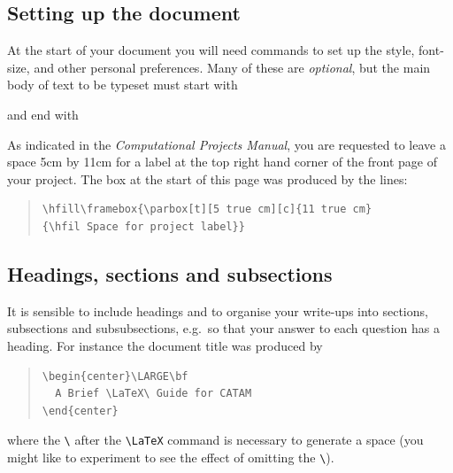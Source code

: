 \subsection{Setting up the document}\label{setup}

At the start of your document you will need commands to set up the
style, font-size, and other personal preferences.  Many of these are
\textit{optional}, but the main body of text to be typeset must start
with
\begin{quote}
\verb||
\end{quote}
and end with
\begin{quote}
\verb||
\end{quote}


As indicated in the \textsl{Computational Projects Manual}, you are
requested to leave a space 5cm by 11cm for a label at the top right
hand corner of the front page of your project. The box at the start of
this page was produced by the lines:
\begin{quote}
\begin{verbatim}
\hfill\framebox{\parbox[t][5 true cm][c]{11 true cm}
{\hfil Space for project label}}
\end{verbatim}
\end{quote}

\subsection{Headings, sections and subsections}

It is sensible to include headings and to organise your write-ups into
sections, subsections and subsubsections, e.g.\ so that your answer to
each question has a heading. For instance the document title was
produced by
\begin{quote}
\begin{verbatim}
\begin{center}\LARGE\bf
  A Brief \LaTeX\ Guide for CATAM
\end{center}
\end{verbatim}
\end{quote}
where the \verb!\! after the \verb!\LaTeX! command is necessary to
generate a space (you might like to experiment to see the effect of
omitting the \verb!\!).

